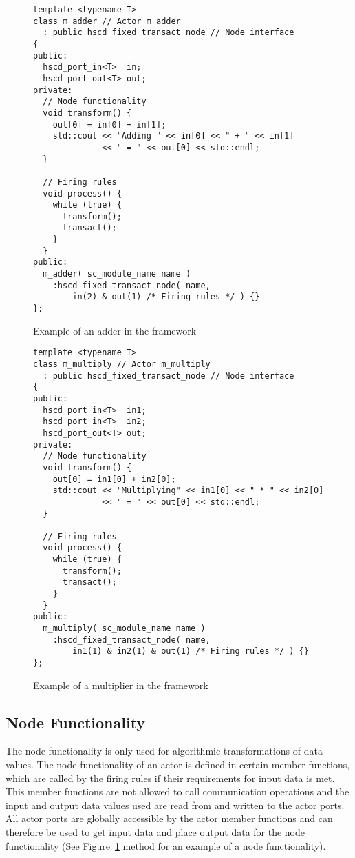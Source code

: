 \begin{figure}
\centering
\begin{verbatim}
template <typename T>
class m_adder // Actor m_adder
  : public hscd_fixed_transact_node // Node interface
{
public:
  hscd_port_in<T>  in;
  hscd_port_out<T> out;
private:
  // Node functionality
  void transform() {
    out[0] = in[0] + in[1];
    std::cout << "Adding " << in[0] << " + " << in[1]
              << " = " << out[0] << std::endl;
  }
  
  // Firing rules
  void process() {
    while (true) {
      transform();
      transact();
    }
  }
public:
  m_adder( sc_module_name name )
    :hscd_fixed_transact_node( name,
        in(2) & out(1) /* Firing rules */ ) {}
};
\end{verbatim}
\caption{\label{example-adder-actor}Example of an adder in the \SysteMoC{} framework}
\end{figure}

\begin{figure}
\centering
\begin{verbatim}
template <typename T>
class m_multiply // Actor m_multiply
  : public hscd_fixed_transact_node // Node interface
{
public:
  hscd_port_in<T>  in1;
  hscd_port_in<T>  in2;
  hscd_port_out<T> out;
private:
  // Node functionality
  void transform() {
    out[0] = in1[0] + in2[0];
    std::cout << "Multiplying" << in1[0] << " * " << in2[0]
              << " = " << out[0] << std::endl;
  }
  
  // Firing rules
  void process() {
    while (true) {
      transform();
      transact();
    }
  }
public:
  m_multiply( sc_module_name name )
    :hscd_fixed_transact_node( name,
        in1(1) & in2(1) & out(1) /* Firing rules */ ) {}
};
\end{verbatim}
\caption{\label{example-multiply-actor}Example of a multiplier in the \SysteMoC{} framework}
\end{figure}

\subsection{Node Functionality}
The node functionality is only used for algorithmic transformations of data values.
The node functionality of an actor is defined in certain member functions,
which are called by the firing rules if their requirements for input data is met.
This member functions are not allowed to call communication operations and
the input and output data values used are read from
and written to the actor ports. All actor ports are globally accessible
by the actor member functions and can therefore be used to get input data
and place output data for the node functionality
(See Figure~\ref{example-adder-actor} method  for an example of a node functionality).

